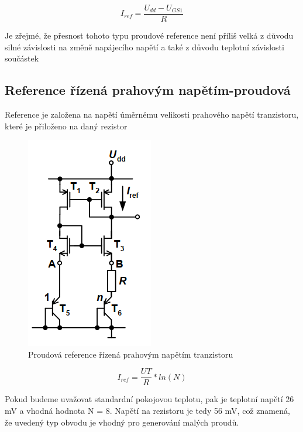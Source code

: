 \begin{equation}
I_{ref} = \frac{U_{dd}-U_{GS1}}{R}
\end{equation}

Je zřejmé, že přesnost tohoto typu proudové reference není příliš velká z důvodu silné závislosti na změně napájecího napětí a také z důvodu teplotní závislosti součástek

\subsection{Reference řízená prahovým napětím-proudová}
Reference je založena na napětí úměrnému velikosti prahového napětí tranzistoru, které je přiloženo na daný rezistor

\begin{figure}[h]
   \begin{center}
     \includegraphics[scale=0.6]{images/PrahI.png}
   \end{center}
   \caption{Proudová reference řízená prahovým napětím tranzistoru}
\end{figure}
\begin{equation}
I_{ref} = \frac{U{T}}{R}*ln(N)
\end{equation}

Pokud budeme uvažovat standardní pokojovou teplotu, pak je teplotní napětí 26 mV a vhodná hodnota N = 8. Napětí na rezistoru je tedy 56 mV, což znamená, že uvedený typ obvodu je vhodný pro generování malých proudů.

